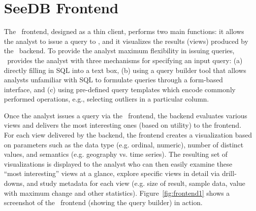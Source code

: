 \chapter{SeeDB Frontend}
\label{subsec:seedb_frontend}

The \SeeDB\ frontend, designed as a thin client, performs two main functions: it
allows the analyst to issue a query to \SeeDB, 
and it visualizes the results (views) produced by the \SeeDB\
backend.
To provide the analyst maximum flexibility in issuing queries, \SeeDB\
provides the analyst with three
mechanisms for specifying an input query: 
(a) directly filling in SQL into a text box, 
(b) using a query builder tool that allows analysts
unfamiliar with SQL to formulate queries through a form-based interface, and (c)
using pre-defined query templates which encode commonly performed operations,
e.g., selecting outliers in a particular column. 

Once the analyst issues a query via the \SeeDB\ frontend, the backend
evaluates various views and delivers the most interesting ones (based on
utility) to the frontend.
For each view delivered by the backend, the frontend creates a visualization
based on parameters such as the data
type (e.g. ordinal, numeric), number of distinct values, and semantics (e.g.
geography vs. time series).
The resulting set of visualizations is displayed to the analyst who can then
easily examine these ``most interesting'' views at a glance, explore specific views in
detail via drill-downs, 
and study metadata for each view (e.g. size of result, sample data, value with
maximum change and other statistics). 
Figure~\ref{fig:frontend1} shows a screenshot of the \SeeDB\ frontend (showing
the query builder) in action.
 
